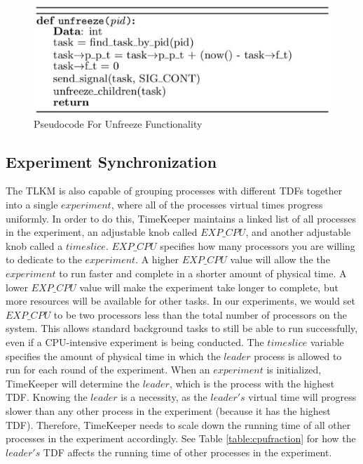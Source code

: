 \begin{figure}[t] 
      \includegraphics[width=\textwidth]{images/unfreeze_alg.eps} 
    \caption{Pseudocode For Unfreeze Functionality} 
    \label{fig:unfreeze_alg} 
  \end{figure} 
\subsection{Experiment Synchronization}
\label{subsec:experiment_synchronization}
        The TLKM is also capable of grouping processes with different TDFs together into a single $experiment$, where all of the processes virtual times progress uniformly. 
        In order to do this, TimeKeeper maintains a linked list of all processes in the experiment, an adjustable knob called $EXP\_CPU$, and another adjustable knob called a $timeslice$. $EXP\_CPU$ specifies how many processors you are willing to dedicate to the $experiment$. A higher $EXP\_CPU$ value will allow the the $experiment$ to run faster and complete in a shorter amount of physical time. A lower $EXP\_CPU$ value will make the experiment take longer to complete, but more resources will be available for other tasks. In our experiments, we would set $EXP\_CPU$ to be two processors less than the total number of processors on the system. This allows standard background tasks to still be able to run successfully, even if a CPU-intensive experiment is being conducted. The $timeslice$ variable specifies the amount of physical time in which the $leader$ process is allowed to run for each round of the experiment. When an $experiment$ is initialized, TimeKeeper will determine the $leader$, which is the process with the highest TDF. Knowing the $leader$ is a necessity, as the $leader's$ virtual time will progress slower than any other process in the experiment (because it has the highest TDF). Therefore, TimeKeeper needs to scale down the running time of all other processes in the experiment accordingly. See Table \ref{table:cpufraction} for how the $leader's$ TDF affects the running time of other processes in the experiment. 
